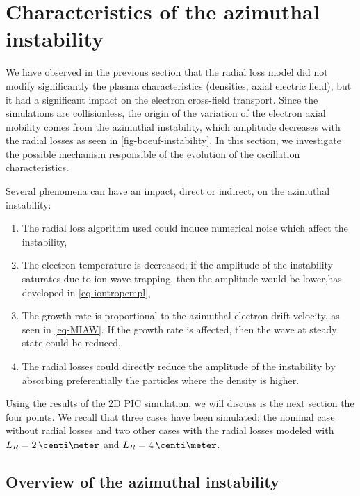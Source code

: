 

\section{Characteristics of the azimuthal instability}
  \label{sec-Ztheta-instability}

  We have observed in the previous section that the radial loss model did not modify significantly the plasma characteristics (densities, axial electric field), but it had a significant impact on the electron cross-field transport.
  Since the simulations are collisionless, the origin of the variation of the electron axial mobility comes from the azimuthal instability, which amplitude decreases with the radial losses as seen in \cref{fig-boeuf-instability}.
  In this section, we investigate the possible mechanism responsible of the evolution of the oscillation characteristics.

  Several phenomena can have an impact, direct or indirect, on the azimuthal instability\string:
  \begin{enumerate}
    \item The radial loss algorithm used could induce numerical noise which affect the instability,
    \item The electron temperature is decreased\string; if the amplitude of the instability saturates due to ion-wave trapping, then the amplitude would be lower,has developed in \cref{eq-iontropempl},
    \item The growth rate is proportional to the azimuthal electron drift velocity, as seen in \cref{eq-MIAW}. If the growth rate is affected, then the wave at steady state could be reduced,
    \item The radial losses  could directly reduce the amplitude of the instability by absorbing preferentially the particles where the density is higher.
  \end{enumerate}

  Using the results of the \ac{2D} \ac{PIC} simulation, we will discuss is the next section the four points.
  We recall that three cases have been simulated\string: the nominal case without radial losses and two other cases with the radial losses modeled with $L_R=2\,\centi\meter$ and $L_R=4\,\centi\meter$.



\subsection{Overview of the azimuthal instability} \label{subsec-azi_insta_Ztheta}

